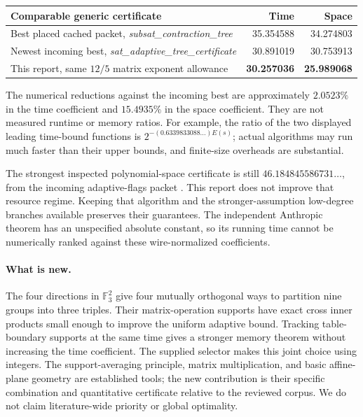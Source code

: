 \documentclass[11pt]{article}
\theoremstyle{definition}\newtheorem{definition}[theorem]{Definition}
\theoremstyle{remark}\newtheorem{remark}[theorem]{Remark}
\newcommand{\F}{\mathbb F}
\begin{document}
\begin{center}
\begin{tabular}{>{\raggedright\arraybackslash}p{6.5cm}rr}
\toprule
Comparable generic certificate & Time & Space\\\midrule
Best placed cached packet, \emph{subsat\_contraction\_tree}
 &35.354588&34.274803\\
Newest incoming best, \emph{sat\_adaptive\_tree\_certificate}
 &30.891019&30.753913\\
This report, same $12/5$ matrix exponent allowance
 &\textbf{30.257036}&\textbf{25.989068}\\\bottomrule
\end{tabular}
\end{center}
The numerical reductions against the incoming best are approximately
$2.0523\%$ in the time coefficient and $15.4935\%$ in the space coefficient.
They are not measured runtime or memory ratios. For example, the ratio of
the two displayed leading time-bound functions is
$2^{-(0.6339833088\ldots)E(s)}$; actual algorithms may run much faster than
their upper bounds, and finite-size overheads are substantial.

The strongest inspected polynomial-space certificate is still
$46.184845586731\ldots$, from the incoming adaptive-flags packet
\cite{flags}. This report does not improve that resource regime. Keeping
that algorithm and the stronger-assumption low-degree branches available
preserves their guarantees. The independent Anthropic theorem has an
unspecified absolute constant, so its running time cannot be numerically
ranked against these wire-normalized coefficients.

\paragraph{What is new.}
The four directions in $\F_3^2$ give four mutually orthogonal ways to
partition nine groups into three triples. Their matrix-operation supports
have exact cross inner products small enough to improve the uniform
adaptive bound. Tracking table-boundary supports at the same time gives
a stronger memory theorem without increasing the time coefficient.
The supplied selector makes this joint choice using integers. The
support-averaging principle, matrix multiplication, and basic affine-plane
geometry are established tools; the new contribution is their specific
combination and quantitative certificate relative to the reviewed corpus.
We do not claim literature-wide priority or global optimality.
\end{document}

